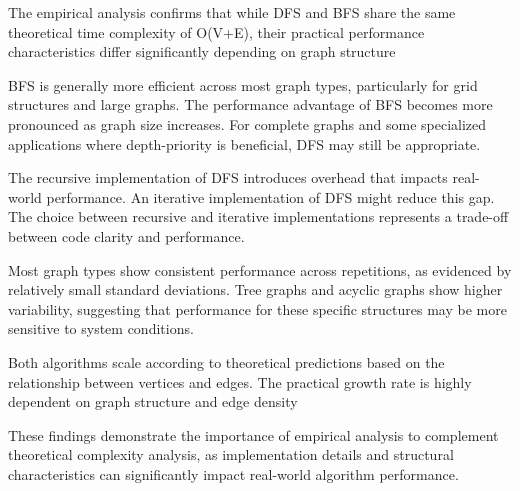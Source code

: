 \documentclass[a4paper,12pt]{article}
\begin{document}
The empirical analysis confirms that while DFS and BFS share the same theoretical time complexity of O(V+E), their practical performance characteristics differ significantly depending on graph structure

BFS is generally more efficient across most graph types, particularly for grid structures and large graphs.
The performance advantage of BFS becomes more pronounced as graph size increases. For complete graphs and some specialized applications where depth-priority is beneficial, DFS may still be appropriate.

The recursive implementation of DFS introduces overhead that impacts real-world performance. An iterative implementation of DFS might reduce this gap. The choice between recursive and iterative implementations represents a trade-off between code clarity and performance.

Most graph types show consistent performance across repetitions, as evidenced by relatively small standard deviations. Tree graphs and acyclic graphs show higher variability, suggesting that performance for these specific structures may be more sensitive to system conditions.

Both algorithms scale according to theoretical predictions based on the relationship between vertices and edges. The practical growth rate is highly dependent on graph structure and edge density

These findings demonstrate the importance of empirical analysis to complement theoretical complexity analysis, as implementation details and structural characteristics can significantly impact real-world algorithm performance.
\end{document}
